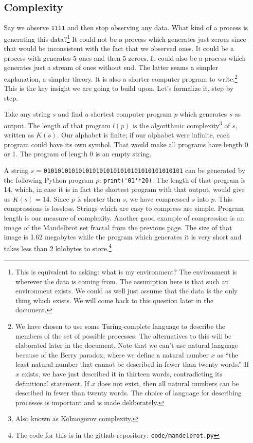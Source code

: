 \documentclass[oneside,hidelinks]{article}
\begin{document}
\newpage

\subsection{Complexity}

Say we observe \texttt{1111} and then stop observing any data.
What kind of a process is generating this data?\footnote{
This is equivalent to asking: what is my environment?
The environment is wherever the data is coming from.
The assumption here is that such an environment exists.
We could as well just assume that the data is the only thing which exists.
We will come back to this question later in the document.
}
It could not be a process which generates just zeroes since that would be inconsistent with the fact that we observed ones.
It could be a process with generates 5 ones and then 5 zeroes.
It could also be a process which generates just a stream of ones without end.
The latter seams a simpler explanation, a simpler theory.
It is also a shorter computer program to write.\footnote{
We have chosen to use some Turing-complete language to describe the members of the set of possible processes.
The alternatives to this will be elaborated later in the document.
Note that we can't use natural language because of the Berry paradox, where we define a natural number $x$ as “the least natural number that cannot be described in fewer than twenty words.”
If $x$ exists, we have just described it in thirteen words, contradicting its definitional statement.
If $x$ does not exist, then all natural numbers can be described in fewer than twenty words.
The choice of language for describing processes is important and is made deliberately.
}
This is the key insight we are going to build upon.
Let's formalize it, step by step.

Take any string $s$ and find a shortest computer program $p$ which generates $s$ as output.
The length of that program $l(p)$ is the algorithmic complexity\footnote{Also known as Kolmogorov complexity.} of $s$, written as $K(s)$.
Our alphabet is finite; if our alphabet were infinite, each program could have its own symbol.
That would make all programs have length 0 or 1.
The program of length 0 is an empty string.

A string $s$ = \texttt{0101010101010101010101010101010101010101} can be generated by the following Python program $p$: \verb|print('01'*20)|.
The length of that program is 14, which, in case it is in fact the shortest program with that output, would give us $K(s) = 14$.
Since $p$ is shorter then $s$, we have compressed $s$ into $p$.
This compressions is lossless.
Strings which are easy to compress are simple.
Program length is our measure of complexity.
Another good example of compression is an image of the Mandelbrot set fractal from the previous page.
The size of that image is 1.62 megabytes while the program which generates it is very short and takes less than 2 kilobytes to store.\footnote{The code for this is in the github repository: \texttt{code/mandelbrot.py}}
\end{document}
